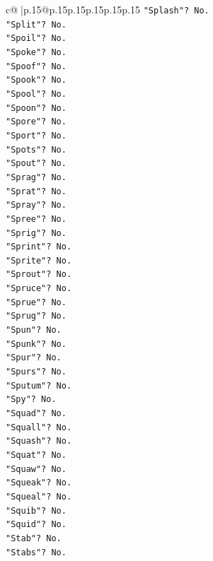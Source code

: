 \documentclass{article}
\begin{document}
{\begin{supertabular}{c@{$\;$}|p{.15\linewidth}@{}p{.15\linewidth}p{.15\linewidth}p{.15\linewidth}p{.15\linewidth}p{.15\linewidth}}
{{{\texttt{"Splash"? No.} \\
\texttt{"Split"? No.} \\
\texttt{"Spoil"? No.} \\
\texttt{"Spoke"? No.} \\
\texttt{"Spoof"? No.} \\
\texttt{"Spook"? No.} \\
\texttt{"Spool"? No.} \\
\texttt{"Spoon"? No.} \\
\texttt{"Spore"? No.} \\
\texttt{"Sport"? No.} \\
\texttt{"Spots"? No.} \\
\texttt{"Spout"? No.} \\
\texttt{"Sprag"? No.} \\
\texttt{"Sprat"? No.} \\
\texttt{"Spray"? No.} \\
\texttt{"Spree"? No.} \\
\texttt{"Sprig"? No.} \\
\texttt{"Sprint"? No.} \\
\texttt{"Sprite"? No.} \\
\texttt{"Sprout"? No.} \\
\texttt{"Spruce"? No.} \\
\texttt{"Sprue"? No.} \\
\texttt{"Sprug"? No.} \\
\texttt{"Spun"? No.} \\
\texttt{"Spunk"? No.} \\
\texttt{"Spur"? No.} \\
\texttt{"Spurs"? No.} \\
\texttt{"Sputum"? No.} \\
\texttt{"Spy"? No.} \\
\texttt{"Squad"? No.} \\
\texttt{"Squall"? No.} \\
\texttt{"Squash"? No.} \\
\texttt{"Squat"? No.} \\
\texttt{"Squaw"? No.} \\
\texttt{"Squeak"? No.} \\
\texttt{"Squeal"? No.} \\
\texttt{"Squib"? No.} \\
\texttt{"Squid"? No.} \\
\texttt{"Stab"? No.} \\
\texttt{"Stabs"? No.} \\
}}}
\end{supertabular}}
\end{document}
